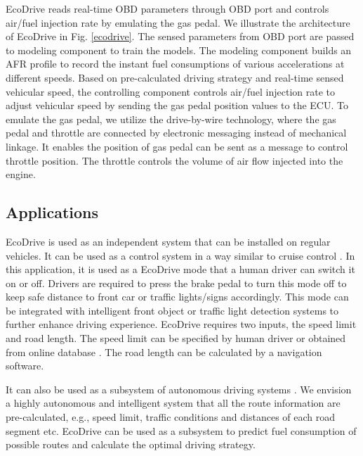 EcoDrive reads real-time OBD parameters through OBD port
and controls air/fuel injection rate by emulating the gas pedal.
We illustrate the architecture of EcoDrive in Fig. \ref{ecodrive}.
The sensed parameters from OBD port are passed to modeling component
to train the models.
The modeling component builds an AFR profile to 
record the instant fuel consumptions of various 
accelerations at different speeds.
Based on pre-calculated driving strategy and real-time sensed vehicular speed, 
the controlling component controls air/fuel injection rate to adjust vehicular speed by 
sending the gas pedal position values to the ECU. 
To emulate the gas pedal, we utilize the drive-by-wire technology, 
where the gas pedal and throttle are connected by electronic messaging instead of mechanical linkage.   
It enables the position of gas pedal can be sent as a message
to control throttle position. 
The throttle controls the volume of air flow injected into the engine. 
 


\subsection{Applications}

EcoDrive is used as an independent system that can be installed
on regular vehicles.  
It can be used as a control system in a way similar to 
cruise control \cite{cruise_control, bengtsson2001adaptive, ioannou1993autonomous}. 
In this application, it is used as a EcoDrive mode that a human driver
can switch it on or off. 
Drivers are required to press the brake pedal to turn this mode off
to keep safe distance to front car or traffic lights/signs accordingly.
This mode can be integrated with intelligent front object or traffic light detection
systems \cite{bengtsson2001adaptive, ioannou1993autonomous} 
to further enhance driving experience. 
EcoDrive requires two inputs, the speed limit and road length. 
The speed limit can be specified by human driver or obtained from online database \cite{speedlimit}. 
The road length can be calculated by a navigation software.



It can also be used as a subsystem of autonomous driving systems 
\cite{googledriverlesscar, urmson2008autonomous, litman2013autonomous, kim2013towards}. 
We envision a highly autonomous and intelligent system that all the route
information are pre-calculated, e.g., speed limit, traffic conditions and
distances of each road segment etc. 
EcoDrive can be used as a subsystem to predict fuel consumption
of possible routes \cite{ganti2010greengps} and 
calculate the optimal driving strategy.  


